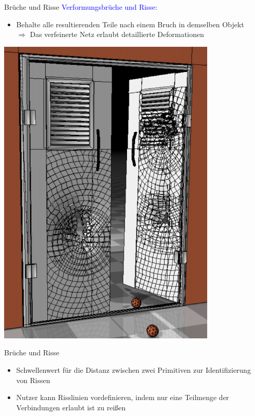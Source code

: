 \documentclass[t]{beamer}
\begin{document}
	\begin{frame}{Brüche und Risse}
		\textcolor{blue}{Verformungsbrüche und Risse:}
		\begin{minipage}{0.5\textwidth}
			\begin{itemize}
				\item Behalte alle resultierenden Teile nach einem Bruch in demselben Objekt\\
				$\Rightarrow$ Das verfeinerte Netz erlaubt detaillierte Deformationen
			\end{itemize}
		\end{minipage}\begin{minipage}{0.5\textwidth}
			\centering
			\includegraphics[scale = 0.35]{Door1.png}
	\end{minipage}

	\end{frame}
	
	\begin{frame}{Brüche und Risse}
		\begin{itemize}
			\item Schwellenwert für die Distanz zwischen zwei Primitiven zur Identifizierung von Rissen
			\item Nutzer kann Risslinien vordefinieren, indem nur eine Teilmenge der Verbindungen erlaubt ist zu reißen
		\end{itemize}
	\end{frame}
\end{document}
